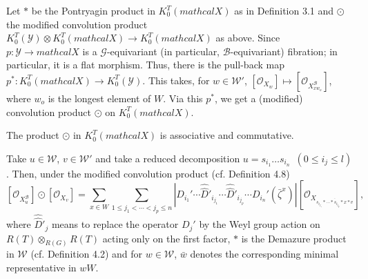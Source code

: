 \documentclass[10pt,a4paper]{amsart}
\def\B{\mathcal{B}}
\def\G{\mathcal{G}}
\def\W{\mathcal{W}}
\def\Y{\mathcal{Y}}
\def\ref#1{#1}
\newcommand{\X}{mathcal{X}}
\begin{document}
\begin{definition}
{Let $*$ be the Pontryagin product in $K_0^T(\X)$ as in Definition 3.1 and $\odot$ the modified convolution product $K_0^T(\Y)\otimes K_0^T(\X)\rightarrow K_0^T(\X)$ as above. Since $p:\Y \rightarrow \X$ is a $\G$-equivariant (in particular, $\B$-equivariant) fibration; in particular, it is a flat morphism. Thus, there is the pull-back map $p^*:K_0^T(\X) \rightarrow K_0^T(\Y)$. This takes, for $w\in \W'$, $[\mathcal{O}_{X_w}]\mapsto[\mathcal{O}_{X^\B_{xw_o}}]$, where $w_o$ is the longest element of $W$. Via this $p^*$, we get a (modified) convolution product $\odot$ on $K_0^T(\X)$. }
\end{definition}

\begin{corollary}\label{4.11}
The product $\odot$ in $K_0^T(\X)$ is associative and commutative. 
\end{corollary}

\begin{theorem} \label{5.9}
Take $u\in \W$, $v\in \W'$ and take a reduced decomposition $u=s_{i_1}\ldots s_{i_n}$\,  $\left(0\leq i_j\leq l\right)$. Then, under the modified convolution product (cf. Definition \ref{4.8})
$$
\left[ \mathcal{O}_{X^\B_u}\right] \odot \left[ \mathcal{O}_{X_v}\right] = \sum_{x\in W} \sum_{1\leq j_1< \cdots <j_p\leq n} \left\vert D_{i_1}' \cdots \hat{\hat{D}}'_{i_{j_1}}\cdots \hat{\hat{D}}'_{i_{j_p}} \cdots D_{i_n}'\left(\bar{\zeta}^x \right)\right\vert [ \mathcal{O}_{X_{\overline{s_{i_{j_1}}*\cdots *s_{i_{j_p}}*x*v}}}],
$$
where $\hat{\hat{D}}'_j$ means to replace the operator $D_j'$ by the Weyl
group action on $R(T) \otimes_{R(G)} R(T)$ acting only on the first factor, $*$ is the Demazure product in $\W$ (cf. Definition \ref{4.2}) and for $w\in \W$, $\bar{w}$ denotes the corresponding minimal representative in $wW$. 
\end{theorem}

\end{document}
